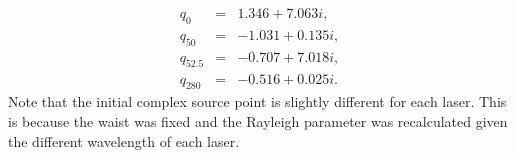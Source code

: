\begin{eqnarray}
q_{0}   &=& 1.346  + 7.063i,\\
q_{50}  &=& -1.031 + 0.135i,\\
q_{52.5}&=& -0.707 + 7.018i,\\
q_{280} &=& -0.516 + 0.025i.
\end{eqnarray}
Note that the initial complex source point is slightly different for each laser. This is because the waist was fixed and the Rayleigh parameter was recalculated given the different wavelength of each laser.

